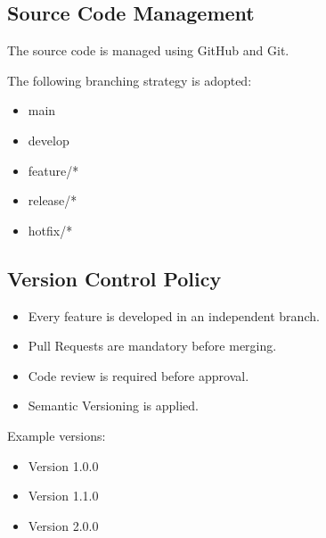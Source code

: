 \subsection{Source Code Management}

The source code is managed using GitHub and Git.

The following branching strategy is adopted:

\begin{itemize}
\item main
\item develop
\item feature/*
\item release/*
\item hotfix/*
\end{itemize}

\subsection{Version Control Policy}

\begin{itemize}
\item Every feature is developed in an independent branch.
\item Pull Requests are mandatory before merging.
\item Code review is required before approval.
\item Semantic Versioning is applied.
\end{itemize}

Example versions:

\begin{itemize}
\item Version 1.0.0
\item Version 1.1.0
\item Version 2.0.0
\end{itemize}
